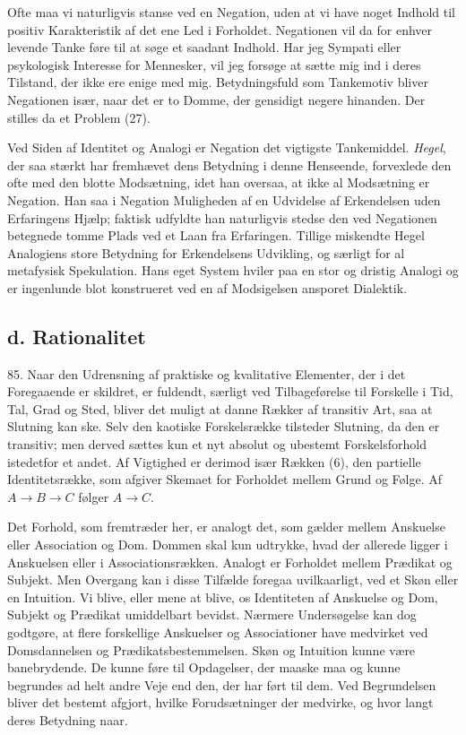\documentclass[12pt,a4paper]{book}
\newcommand{\opage}[1]{\marginnote{\footnotesize\textit{[#1]}}}
\newcommand{\apage}[1]{\marginnote{\footnotesize\textit{[#1]}}}
\begin{document}
Ofte maa vi naturligvis stanse ved en Negation, uden at vi have noget Indhold til
positiv Karakteristik af det ene Led i Forholdet. Negationen vil da for enhver
levende Tanke føre til at søge et saadant Indhold. Har jeg Sympati eller
psykologisk Interesse for Mennesker, vil jeg forsøge at sætte mig ind i deres
Tilstand, der ikke ere enige med mig. Betydningsfuld som Tankemotiv bliver
Negationen især, naar det er to Domme, der gensidigt negere hinanden. Der stilles
da et Problem (27).

\apage{204} Ved Siden af Identitet og Analogi er Negation det vigtigste Tankemiddel.
\emph{Hegel}, der saa stærkt har fremhævet dens Betydning i denne Henseende,
forvexlede den ofte med den blotte Modsætning, idet han oversaa, at ikke al
Modsætning er Negation. Han saa i Negation Muligheden af en Udvidelse af
Erkendelsen uden Erfaringens Hjælp; faktisk udfyldte han naturligvis stedse den
ved Negationen betegnede tomme Plads ved et Laan fra Erfaringen. Tillige
miskendte Hegel Analogiens store Betydning for Erkendelsens Udvikling, og særligt
for al metafysisk Spekulation. Hans eget System hviler paa en stor og dristig
Analogi og er ingenlunde blot konstrueret ved en af Modsigelsen ansporet
Dialektik.

\subsection*{d. Rationalitet}

85. Naar den Udrensning af praktiske og kvalitative Elementer, der i det
Foregaaende er skildret, er fuldendt, særligt ved Tilbageførelse til Forskelle i
Tid, Tal, Grad og Sted, bliver det muligt at danne Rækker af transitiv Art, saa
at Slutning kan ske. Selv den kaotiske Forskelsrække tilsteder Slutning, da den
er transitiv; men derved sættes kun et nyt absolut og ubestemt Forskelsforhold
istedetfor et andet. Af Vigtighed er derimod især Rækken (6), den partielle
Identitetsrække, som afgiver Skemaet for Forholdet mellem Grund og Følge. Af
$A \to B \to C$ følger $A \to C$.

Det Forhold, som fremtræder her, er analogt det, som gælder mellem Anskuelse
eller Association og Dom. Dommen skal kun udtrykke, hvad der allerede ligger i
Anskuelsen eller i Associationsrækken. Analogt er Forholdet mellem Prædikat og
Subjekt. Men Overgang kan i disse Tilfælde foregaa uvilkaarligt, ved et Skøn
eller en Intuition. Vi blive, eller mene at blive, os Identiteten af Anskuelse og
Dom, Subjekt og Prædikat umiddelbart bevidst. Nærmere Undersøgelse kan dog
godtgøre, at flere forskellige Anskuelser og Associationer have medvirket ved
Domsdannelsen og Prædikatsbestemmelsen. Skøn og Intuition kunne være
banebrydende. De kunne føre til Opdagelser, der maaske maa \opage{205} og kunne begrundes ad
helt andre Veje end den, der har ført til dem. Ved Begrundelsen bliver det
bestemt afgjort, hvilke Forudsætninger der medvirke, og hvor langt deres Betydning
naar.
\end{document}
